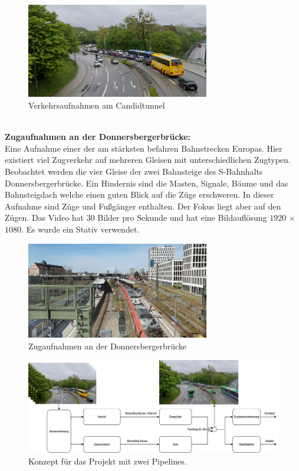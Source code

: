 \documentclass[conference]{IEEEtran}
\begin{document}
	\begin{figure}[!h]
		\begin{center}
			\includegraphics[width=8cm]{Media/CandidRaw.png}
			\caption{Verkehrsaufnahmen am Candidtunnel}
			\label{CandidtunnelRaw}
		\end{center}
	\end{figure}\\
	\textbf{Zugaufnahmen an der Donnersbergerbrücke:}\\
	Eine Aufnahme einer der am stärksten befahren Bahnstrecken Europas\cite{z1}. Hier existiert viel Zugverkehr auf mehreren Gleisen mit unterschiedlichen Zugtypen. Beobachtet werden die vier Gleise der zwei Bahnsteige des S-Bahnhalts Donnersbergerbrücke. Ein Hindernis sind die Masten, Signale, Bäume und das Bahnsteigdach welche einen guten Blick auf die Züge erschweren. In dieser Aufnahme sind Züge und Fußgänger enthalten. Der Fokus liegt aber auf den Zügen. Das Video hat 30 Bilder pro Sekunde und hat eine Bildauflösung $1920$ × $1080$. Es wurde ein Stativ verwendet.\\
	\begin{figure}[!h]
		\begin{center}
			\includegraphics[width=8cm]{Media/DonnersbergerRaw.png}
			\caption{Zugaufnahmen an der Donnersbergerbrücke}
			\label{DonnersbergerRaw}
		\end{center}
	\end{figure}
	
	\begin{figure}[!h]
		\begin{center}
			\includegraphics[width=16cm]{Media/KonzeptVAOT.png}
			\caption{Konzept für das Projekt mit zwei Pipelines.}
			\label{Konzept}
		\end{center}
	\end{figure}
	
\end{document}
